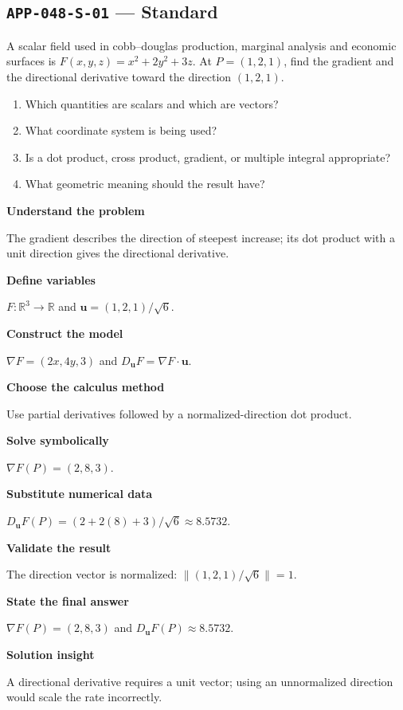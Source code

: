 \documentclass[11pt]{book}
\newcommand{\pid}[1]{\texttt{#1}}
\begin{document}
\subsection*{\pid{APP-048-S-01} — Standard}
\begin{problembox}
A scalar field used in cobb–douglas production, marginal analysis and economic surfaces is $F(x,y,z)=x^2+2y^2+3z$. At $P=(1,2,1)$, find the gradient and the directional derivative toward the direction $(1,2,1)$.
\end{problembox}
\begin{promptbox}\begin{enumerate}
\item Which quantities are scalars and which are vectors?
\item What coordinate system is being used?
\item Is a dot product, cross product, gradient, or multiple integral appropriate?
\item What geometric meaning should the result have?
\end{enumerate}\end{promptbox}
\begin{solutionbox}
\textbf{Understand the problem}\par The gradient describes the direction of steepest increase; its dot product with a unit direction gives the directional derivative.\par\medskip
\textbf{Define variables}\par $F:\mathbb R^3\to\mathbb R$ and $\mathbf u=(1,2,1)/\sqrt6$.\par\medskip
\textbf{Construct the model}\par $\nabla F=(2x,4y,3)$ and $D_{\mathbf u}F=\nabla F\cdot\mathbf u$.\par\medskip
\textbf{Choose the calculus method}\par Use partial derivatives followed by a normalized-direction dot product.\par\medskip
\textbf{Solve symbolically}\par $\nabla F(P)=(2,8,3)$.\par\medskip
\textbf{Substitute numerical data}\par $D_{\mathbf u}F(P)=(2+2(8)+3)/\sqrt6\approx 8.5732$.\par\medskip
\textbf{Validate the result}\par The direction vector is normalized: $\|(1,2,1)/\sqrt6\|=1$.\par\medskip
\textbf{State the final answer}\par $\nabla F(P)=(2,8,3)$ and $D_{\mathbf u}F(P)\approx 8.5732$.\par\medskip
\textbf{Solution insight}\par A directional derivative requires a unit vector; using an unnormalized direction would scale the rate incorrectly.\par\medskip
\end{solutionbox}
\end{document}
